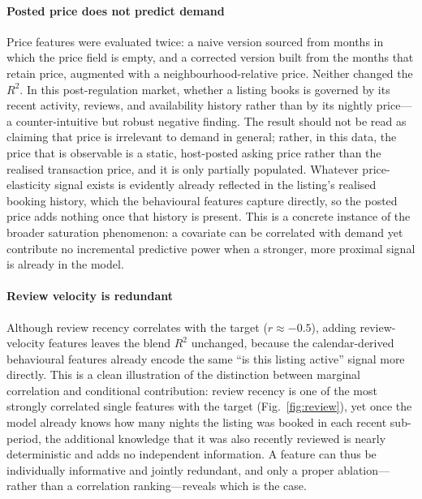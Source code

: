 \documentclass[journal]{IEEEtran}
\begin{document}
\paragraph{Posted price does not predict demand}
Price features were evaluated twice: a naive version sourced from months in which
the price field is empty, and a corrected version built from the months that
retain price, augmented with a neighbourhood-relative price. Neither changed the
$R^2$. In this post-regulation market, whether a listing books is governed by its
recent activity, reviews, and availability history rather than by its nightly
price---a counter-intuitive but robust negative finding. The result should not be
read as claiming that price is irrelevant to demand in general; rather, in this
data, the price that is observable is a static, host-posted asking price rather than
the realised transaction price, and it is only partially populated. Whatever
price-elasticity signal exists is evidently already reflected in the listing's
realised booking history, which the behavioural features capture directly, so the
posted price adds nothing once that history is present. This is a concrete instance
of the broader saturation phenomenon: a covariate can be correlated with demand yet
contribute no incremental predictive power when a stronger, more proximal signal is
already in the model.

\paragraph{Review velocity is redundant}
Although review recency correlates with the target ($r\approx-0.5$), adding
review-velocity features leaves the blend $R^2$ unchanged, because the
calendar-derived behavioural features already encode the same ``is this listing
active'' signal more directly. This is a clean illustration of the distinction
between marginal correlation and conditional contribution: review recency is one of
the most strongly correlated single features with the target
(Fig.~\ref{fig:review}), yet once the model already knows how many nights the
listing was booked in each recent sub-period, the additional knowledge that it was
also recently reviewed is nearly deterministic and adds no independent information.
A feature can thus be individually informative and jointly redundant, and only a
proper ablation---rather than a correlation ranking---reveals which is the case.
\end{document}
